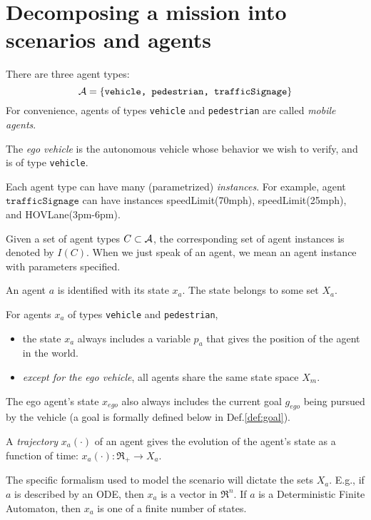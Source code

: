 \section{Decomposing a mission into scenarios and agents}
\label{scenarios and agents}

\begin{defn}[Agents]
	There are three agent types:
	\[\mathcal{A} = \{\texttt{vehicle, pedestrian, trafficSignage}\}\]
	For convenience, agents of types  \texttt{vehicle} and \texttt{pedestrian} are called \emph{mobile agents}. 
	
	The \emph{ego vehicle} is the autonomous vehicle whose behavior we wish to verify, and is of type \texttt{vehicle}.	
\end{defn}
	
	Each agent type can have many (parametrized) \emph{instances}.
	For example, agent $\texttt{trafficSignage}$ can have instances speedLimit(70mph), speedLimit(25mph), and HOVLane(3pm-6pm).
	
	Given a set of agent types $C \subset \mathcal{A}$, the corresponding set of agent instances is denoted by $I(C)$.
When we just speak of an agent, we mean an agent instance with parameters specified.

\begin{defn}
	\label{def:agent state}
An agent $a$ is identified with its state $x_a$. 
The state belongs to some set $X_a$. 

For agents $x_a$ of types \texttt{vehicle} and \texttt{pedestrian}, 
\begin{itemize}
	\item the state $x_a$ always includes a variable $p_a$ that gives the position of the agent in the world.
	\item \emph{except for the ego vehicle}, all agents share the same state space $X_m$.
\end{itemize}

The ego agent's state $x_{ego}$ also always includes the current goal $g_{ego}$ being pursued by the vehicle (a goal is formally defined below in Def.\ref{def:goal}).

A \emph{trajectory} $x_a(\cdot)$ of an agent gives the evolution of the agent's state as a function of time: $x_a(\cdot): \Re_+ \rightarrow X_a$.
\end{defn}

The specific formalism used to model the scenario will dictate the sets $X_a$.
E.g., if $a$ is described by an ODE, then $x_a$ is a vector in $\Re^n$.
If $a$ is a Deterministic Finite Automaton, then $x_a$ is one of a finite number of states.

